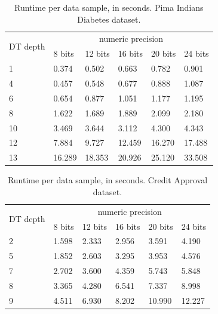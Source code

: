 \begin{table}[H]
\centering
\caption{Runtime per data sample, in seconds. Pima Indians Diabetes dataset.}
\label{table:runtimeDTPID}
\begin{tabular}{|l|l|l|l|l|l|}
\hline
\multirow{2}{*}{DT depth} & \multicolumn{5}{c|}{numeric precision}         \\ \cline{2-6} 
                          & 8 bits & 12 bits & 16 bits & 20 bits & 24 bits \\ \hline
1                         & 0.374  & 0.502   & 0.663   & 0.782   & 0.901   \\ \hline
4                         & 0.457  & 0.548   & 0.677   & 0.888   & 1.087   \\ \hline
6                         & 0.654  & 0.877   & 1.051   & 1.177   & 1.195   \\ \hline
8                         & 1.622  & 1.689   & 1.889   & 2.099   & 2.180   \\ \hline
10                        & 3.469  & 3.644   & 3.112   & 4.300   & 4.343   \\ \hline
12                        & 7.884  & 9.727   & 12.459  & 16.270  & 17.488  \\ \hline
13                        & 16.289 & 18.353  & 20.926  & 25.120  & 33.508  \\ \hline
\end{tabular}
\end{table}

\begin{table}[H]
\centering
\caption{Runtime per data sample, in seconds. Credit Approval dataset.}
\label{table:runtimeDTCA}
\begin{tabular}{|l|l|l|l|l|l|}
\hline
\multirow{2}{*}{DT depth} & \multicolumn{5}{c|}{numeric precision}         \\ \cline{2-6} 
                          & 8 bits & 12 bits & 16 bits & 20 bits & 24 bits \\ \hline
2                         & 1.598  & 2.333   & 2.956   & 3.591   & 4.190   \\ \hline
5                         & 1.852  & 2.603   & 3.295   & 3.953   & 4.576   \\ \hline
7                         & 2.702  & 3.600   & 4.359   & 5.743   & 5.848   \\ \hline
8                         & 3.365  & 4.280   & 6.541   & 7.337   & 8.998   \\ \hline
9                         & 4.511  & 6.930   & 8.202   & 10.990  & 12.227  \\ \hline
\end{tabular}
\end{table}


